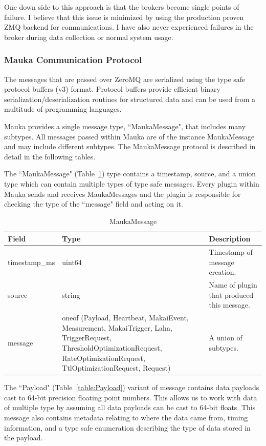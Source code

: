 One down side to this approach is that the brokers become single points of failure. I believe that this issue is minimized by using the production proven ZMQ backend for communications. I have also never experienced failures in the broker during data collection or normal system usage.

\subsubsection{Mauka Communication Protocol}
The messages that are passed over ZeroMQ are serialized using the type safe protocol buffers (v3) format. Protocol buffers provide efficient binary serialization/deserialization routines for structured data and can be used from a multitude of programming languages.

Mauka provides a single message type, ``MaukaMessage", that includes many subtypes. All messages passed within Mauka are of the instance MaukaMessage and may include different subtypes. The MaukaMessage protocol is described in detail in the following tables.

The ``MaukaMessage" (Table~\ref{table:MaukaMessage}) type contains a timestamp, source, and a union type which can contain multiple types of type safe messages. Every plugin within Mauka sends and receives MaukaMessages and the plugin is responsible for checking the type of the ``message" field and acting on it.

\begin{table}[H]
	\centering
	\caption{MaukaMessage}
	\begin{tabularx}{\textwidth}{lXX}
		\toprule
		\textbf{Field} & \textbf{Type} & \textbf{Description} \\
		\midrule
		timestamp\_ms & uint64 & Timestamp of message creation.  \\
		source & string & Name of plugin that produced this message. \\
		message & oneof (Payload, Heartbeat, MakaiEvent, Measurement, MakaiTrigger, Laha, TriggerRequest, ThresholdOptimizationRequest, RateOptimizationRequest, TtlOptimizationRequest, Request) & A union of subtypes. \\
		\bottomrule
	\end{tabularx}
	\label{table:MaukaMessage}
\end{table}

The ``Payload" (Table~\ref{table:Payload}) variant of message contains data payloads cast to 64-bit precision floating point numbers. This allows us to work with data of multiple type by assuming all data payloads can be cast to 64-bit floats. This message also contains metadata relating to where the data came from, timing information, and a type safe enumeration describing the type of data stored in the payload.

